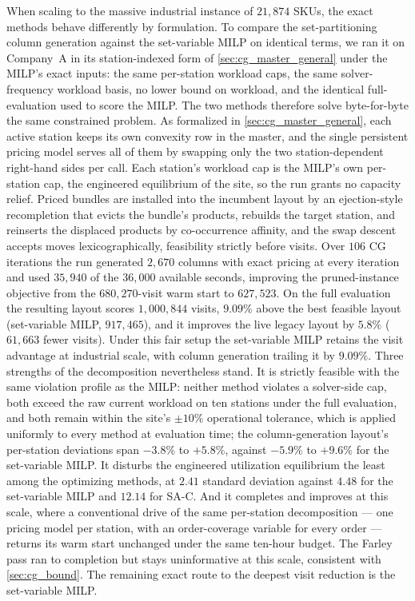\documentclass[preprint,review,11pt,authoryear]{elsarticle}
\begin{document}
When scaling to the massive industrial instance of $21{,}874$ SKUs, the exact methods behave differently by formulation. To compare the set-partitioning column generation against the set-variable MILP on identical terms, we ran it on Company~A in its station-indexed form of \cref{sec:cg_master_general} under the MILP's exact inputs: the same per-station workload caps, the same solver-frequency workload basis, no lower bound on workload, and the identical full-evaluation used to score the MILP. The two methods therefore solve byte-for-byte the same constrained problem. As formalized in \cref{sec:cg_master_general}, each active station keeps its own convexity row in the master, and the single persistent pricing model serves all of them by swapping only the two station-dependent right-hand sides per call. Each station's workload cap is the MILP's own per-station cap, the engineered equilibrium of the site, so the run grants no capacity relief. Priced bundles are installed into the incumbent layout by an ejection-style recompletion that evicts the bundle's products, rebuilds the target station, and reinserts the displaced products by co-occurrence affinity, and the swap descent accepts moves lexicographically, feasibility strictly before visits. Over $106$ CG iterations the run generated $2{,}670$ columns with exact pricing at every iteration and used $35{,}940$ of the $36{,}000$ available seconds, improving the pruned-instance objective from the $680{,}270$-visit warm start to $627{,}523$. On the full evaluation the resulting layout scores $1{,}000{,}844$ visits, $9.09\%$ above the best feasible layout (set-variable MILP, $917{,}465$), and it improves the live legacy layout by $5.8\%$ ($61{,}663$ fewer visits). Under this fair setup the set-variable MILP retains the visit advantage at industrial scale, with column generation trailing it by $9.09\%$. Three strengths of the decomposition nevertheless stand. It is strictly feasible with the same violation profile as the MILP: neither method violates a solver-side cap, both exceed the raw current workload on ten stations under the full evaluation, and both remain within the site's $\pm 10\%$ operational tolerance, which is applied uniformly to every method at evaluation time; the column-generation layout's per-station deviations span $-3.8\%$ to $+5.8\%$, against $-5.9\%$ to $+9.6\%$ for the set-variable MILP. It disturbs the engineered utilization equilibrium the least among the optimizing methods, at $2.41$ standard deviation against $4.48$ for the set-variable MILP and $12.14$ for SA-C. And it completes and improves at this scale, where a conventional drive of the same per-station decomposition --- one pricing model per station, with an order-coverage variable for every order --- returns its warm start unchanged under the same ten-hour budget. The Farley pass ran to completion but stays uninformative at this scale, consistent with \cref{sec:cg_bound}. The remaining exact route to the deepest visit reduction is the set-variable MILP.
\end{document}
